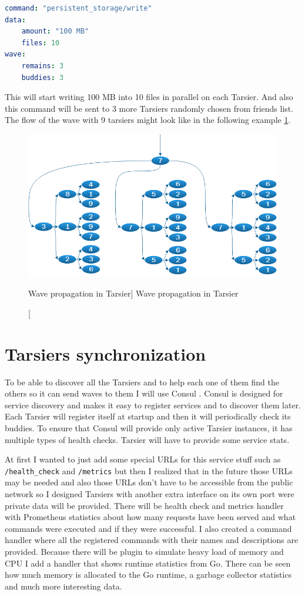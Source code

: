 \begin{lstlisting}[language=yaml,caption=Command 'write' body structure]
command: "persistent_storage/write"
data:
    amount: "100 MB"
    files: 10
wave: 
    remains: 3
    buddies: 3
\end{lstlisting}
 
This will start writing 100 MB into 10 files in parallel on each Tarsier. And also this command will be sent to 3 more Tarsiers randomly chosen from friends list. The flow of the wave with 9 tarsiers might look like in the following example \ref{fig:tarsier-wave}. 
                
\begin{figure}[htb]\centering
  \includegraphics[width=1\textwidth]{images/wave.png}
  \caption
    [Wave propagation in Tarsier]
    {Wave propagation in Tarsier}
  \label{fig:tarsier-wave}
\end{figure}

\section{Tarsiers synchronization}
To be able to discover all the Tarsiers and to help each one of them find the others so it can send waves to them I will use Consul \cite{consul}. Consul is designed for service discovery and makes it easy to register services and to discover them later. Each Tarsier will register itself at startup and then it will periodically check its buddies. To ensure that Consul will provide only active Tarsier instances, it has multiple types of health checks. Tarsier will have to provide some service stats.

At first I wanted to just add some special URLs for this service stuff such as \lstinline{/health_check} and \lstinline{/metrics} but then I realized that in the future those URLs may be needed and also those URLs don’t have to be accessible from the public network so I designed Tarsiers with another extra interface on its own port were private data will be provided. There will be health check and metrics handler with Prometheus statistics about how many requests have been served and what commands were executed and if they were successful. I also created a command handler where all the registered commands with their names and descriptions are provided. Because there will be plugin to simulate heavy load of memory and CPU I add a handler that shows runtime statistics from Go. There can be seen how much memory is allocated to the Go runtime, a garbage collector statistics and much more interesting data.

